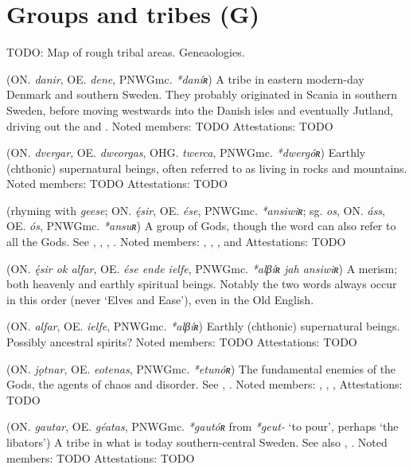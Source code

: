 \section{Groups and tribes (G)}

TODO: Map of rough tribal areas. Geneaologies.

\begin{itemize}

 (ON. \emph{danir}, OE. \emph{dene}, PNWGmc. \emph{*daníʀ})
  A tribe in eastern modern-day Denmark and southern Sweden. They probably originated in Scania in southern Sweden, before moving westwards into the Danish isles and eventually Jutland, driving out the  and .
  Noted members: TODO
  Attestations: TODO

 (ON. \emph{dvergar}, OE. \emph{dweorgas}, OHG. \emph{twerca}, PNWGmc. \emph{*dwergóʀ})
  Earthly (chthonic) supernatural beings, often referred to as living in rocks and mountains.
  Noted members: TODO
  Attestations: TODO

 (rhyming with \emph{geese}; ON. \emph{ę́sir}, OE. \emph{ése}, PNWGmc. \emph{*ansiwiʀ}; sg. \emph{os}, ON. \emph{áss}, OE. \emph{ós}, PNWGmc. \emph{*ansuʀ})
  A group of Gods, though the word can also refer to all the Gods. See , , , .
  Noted members: , , ,  and 
  Attestations: TODO

 (ON. \emph{ę́sir ok alfar}, OE. \emph{ése ende ielfe}, PNWGmc. \emph{*alβíʀ jah ansiwiʀ})
  A merism; both heavenly and earthly spiritual beings. Notably the two words always occur in this order (never ‘Elves and Ease’), even in the Old English.

 (ON. \emph{alfar}, OE. \emph{ielfe}, PNWGmc. \emph{*alβíʀ})
  Earthly (chthonic) supernatural beings. Possibly ancestral spirits?
  Noted members: TODO
  Attestations: TODO

 (ON. \emph{jǫtnar}, OE. \emph{eotenas}, PNWGmc. \emph{*etunóʀ})
  The fundamental enemies of the Gods, the agents of chaos and disorder. See , .
  Noted members: , , , 
  Attestations: TODO

 (ON. \emph{gautar}, OE. \emph{géatas}, PNWGmc. \emph{*gautóʀ} from \emph{*geut-} ‘to pour’, perhaps ‘the libators’)
  A tribe in what is today southern-central Sweden. See also , .
  Noted members: TODO
  Attestations: TODO


\end{itemize}
